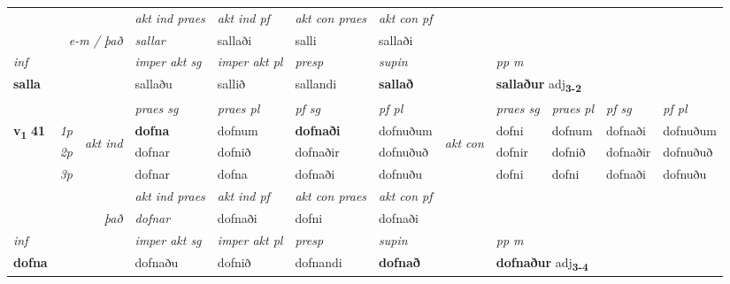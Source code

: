 \begin{longtable}[l]{X>{\footnotesize\itshape}llXXXXlXXXX}
   && &  \textit{akt ind praes} & \textit{akt ind pf} & \textit{akt con praes} & \textit{akt con pf} \\*
\multicolumn{3}{r}{\textit{e-m / það}} & sallar & sallaði & salli & sallaði \\*

\cmidrule{4-7}
   {\textit{inf}} & &  & \textit{imper akt sg} & \textit{imper akt pl}   & \textit{presp} & \textit{supin}  && \textit{pp m} \\*
  {\textbf{salla}} & && sallaðu  & sallið   & sallandi &  \textbf{sallað}  && \multicolumn{2}{l}{\textbf{sallaður} adj\textbf{\textsubscript{3-2}}} \\*

\midrule

 & &   & \textit{praes sg}  & \textit{praes pl}    & \textit{ pf sg} & \textit{pf pl} & & \textit{praes sg}  & \textit{praes pl}    & \textit{pf sg} & \textit{pf pl }  \\ \cmidrule{4-7} \cmidrule{9-12}
 \multirow{2}{*}{{{\textbf{v{\textsubscript{1}}} \Large{\textbf{41}}}}}  & 1p & \multirow{3}{*}{\begin{turn}{90}\textit{akt ind}\end{turn}} & \textbf{dofna} & dofnum & \textbf{dofnaði} & dofnuðum & \multirow{3}{*}{\begin{turn}{90}\textit{akt con}\end{turn}} &dofni & dofnum & dofnaði & dofnuðum\\*
 & 2p &  &  dofnar  & dofnið & dofnaðir & dofnuðuð & & dofnir & dofnið & dofnaðir & dofnuðuð \\*
 & 3p &  & dofnar & dofna & dofnaði & dofnuðu & & dofni & dofni& dofnaði & dofnuðu \\*
\cmidrule{4-7} \cmidrule{9-12}

   && &  \textit{akt ind praes} & \textit{akt ind pf} & \textit{akt con praes} & \textit{akt con pf} \\*
\multicolumn{3}{r}{\textit{það}} & dofnar & dofnaði & dofni & dofnaði \\*

\cmidrule{4-7}
   {\textit{inf}} & &  & \textit{imper akt sg} & \textit{imper akt pl}   & \textit{presp} & \textit{supin}  && \textit{pp m} \\*
  {\textbf{dofna}} & && dofnaðu  & dofnið   & dofnandi &  \textbf{dofnað}  && \multicolumn{2}{l}{\textbf{dofnaður} adj\textbf{\textsubscript{3-4}}} \\*

\midrule


\end{longtable}
